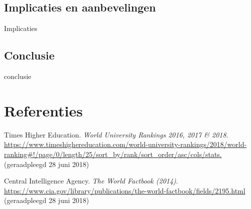 \documentclass{uva-inf-article}
\begin{document}
\subsection{Implicaties en aanbevelingen}
Implicaties

\subsection{Conclusie}
conclusie


\section{Referenties}
\begin{thebibliography}{9}
Times Higher Education. \textit{World University Rankings 2016, 2017 \& 2018}. \url{https://www.timeshighereducation.com/world-university-rankings/2018/world-ranking#!/page/0/length/25/sort_by/rank/sort_order/asc/cols/stats.} (geraadpleegd 28 juni 2018)

Central Intelligence Agency. \textit{The World Factbook (2014)}. \url{https://www.cia.gov/library/publications/the-world-factbook/fields/2195.html}   (geraadpleegd 28 juni 2018)

\end{thebibliography}









\end{document}
